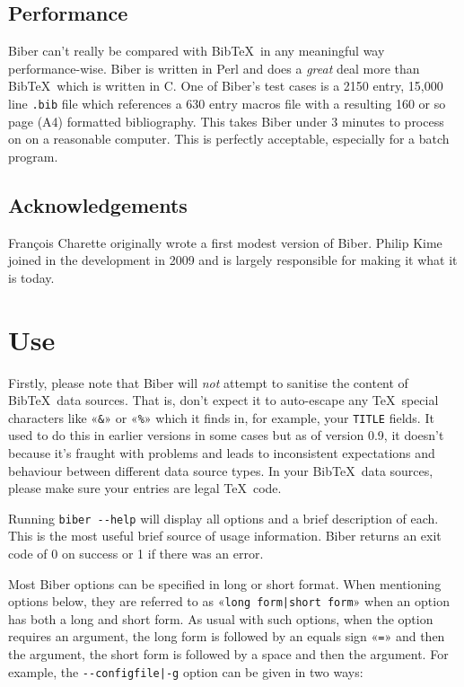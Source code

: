 \documentclass{ltxdockit}
\begin{document}
\subsection{Performance}

Biber can't really be compared with Bib\TeX\ in any meaningful
way performance-wise. Biber is written in Perl and does a
\emph{great} deal more than Bib\TeX\ which is written in C. One of
Biber's test cases is a 2150 entry, 15,000 line \verb+.bib+ file
which references a 630 entry macros file with a resulting 160 or so page (A4)
formatted bibliography. This takes Biber under 3 minutes to process on
on a reasonable computer. This is perfectly acceptable, especially for a
batch program.

\subsection{Acknowledgements}

François Charette originally wrote a first modest version of Biber. Philip Kime joined in
the development in 2009 and is largely responsible for making it what it is today. 

\section{Use}

Firstly, please note that Biber will \emph{not} attempt to sanitise
the content of Bib\TeX\ data sources. That is, don't expect it to
auto-escape any \TeX\ special characters like «\verb+&+» or «\verb+%+» which
it finds in, for example, your \verb+TITLE+ fields. It used to do this in
earlier versions in some cases but as of version 0.9, it doesn't because
it's fraught with problems and leads to inconsistent expectations and
behaviour between different data source types. In your Bib\TeX\ data
sources, please make sure your entries are legal \TeX\ code.

Running \verb+biber --help+ will display all options and a brief
description of each. This is the most useful brief source of usage
information. Biber returns an exit code of 0 on success or 1 if
there was an error.

Most Biber options can be specified in long or short format. When
mentioning options below, they are referred to as
«\verb+long form|short form+» when an option has both a long and short
form. As usual with such options, when the option requires an argument, the
long form is followed by an equals sign «\verb+=+» and then the argument,
the short form is followed by a space and then the argument. For example,
the \verb+--configfile|-g+ option can be given in two ways:
\end{document}
